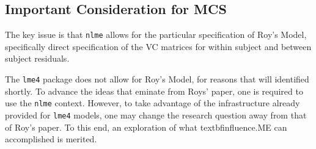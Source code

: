 	\subsection{Important Consideration for MCS}
	
	The key issue is that \texttt{nlme} allows for the particular specification of Roy's Model, specifically direct specification of the VC matrices for within subject and between subject residuals.
	
	The \texttt{lme4} package does not allow for Roy's Model, for reasons that will identified shortly.
	To advance the ideas that eminate from Roys' paper, one is required to use the \texttt{nlme} context. However, to take advantage of the infrastructure already provided for \texttt{lme4} models, one may change the research question away from that of Roy's paper. 
	To this end, an exploration of what textbf{influence.ME} can accomplished is merited.
